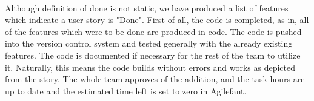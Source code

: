 \paragraph{} Although definition of done is not static, we have produced a list of features which indicate a user story is "Done". First of all, the code is completed, as in, all of the features which were to be done are produced in code. The code is pushed into the version control system and tested generally with the already existing features. The code is documented if necessary for the rest of the team to utilize it. Naturally, this means the code builds without errors and works as depicted from the story. The whole team approves of the addition, and the task hours are up to date and the estimated time left is set to zero in Agilefant.

